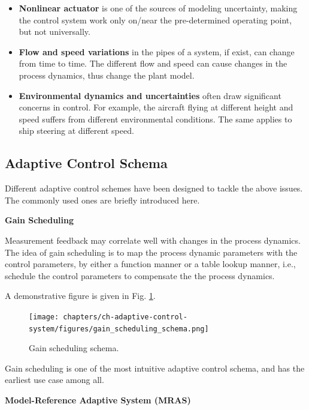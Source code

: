 \begin{itemize}
	\item \textbf{Nonlinear actuator} is one of the sources of modeling uncertainty, making the control system work only on/near the pre-determined operating point, but not universally.
	\item \textbf{Flow and speed variations} in the pipes of a system, if exist, can change from time to time. The different flow and speed can cause changes in the process dynamics, thus change the plant model.
	\item \textbf{Environmental dynamics and uncertainties} often draw significant concerns in control. For example, the aircraft flying at different height and speed suffers from different environmental conditions. The same applies to ship steering at different speed.
\end{itemize}

\subsection{Adaptive Control Schema}

Different adaptive control schemes have been designed to tackle the above issues. The commonly used ones are briefly introduced here.

\vspace{0.1in}
\noindent \textbf{Gain Scheduling}
\vspace{0.1in}

Measurement feedback may correlate well with changes in the process dynamics. The idea of gain scheduling is to map the process dynamic parameters with the control parameters, by either a function manner or a table lookup manner, i.e., schedule the control parameters to compensate the the process dynamics.

A demonstrative figure is given in Fig. \ref{ch:acs:fig:gain_scheduling_schema}.

\begin{figure}
	\centering
	\texttt{[image: chapters/ch-adaptive-control-system/figures/gain\_scheduling\_schema.png]}
	\caption{Gain scheduling schema.} \label{ch:acs:fig:gain_scheduling_schema}
\end{figure}

Gain scheduling is one of the most intuitive adaptive control schema, and has the earliest use case among all.

\vspace{0.1in}
\noindent \textbf{Model-Reference Adaptive System (MRAS)}
\vspace{0.1in}

